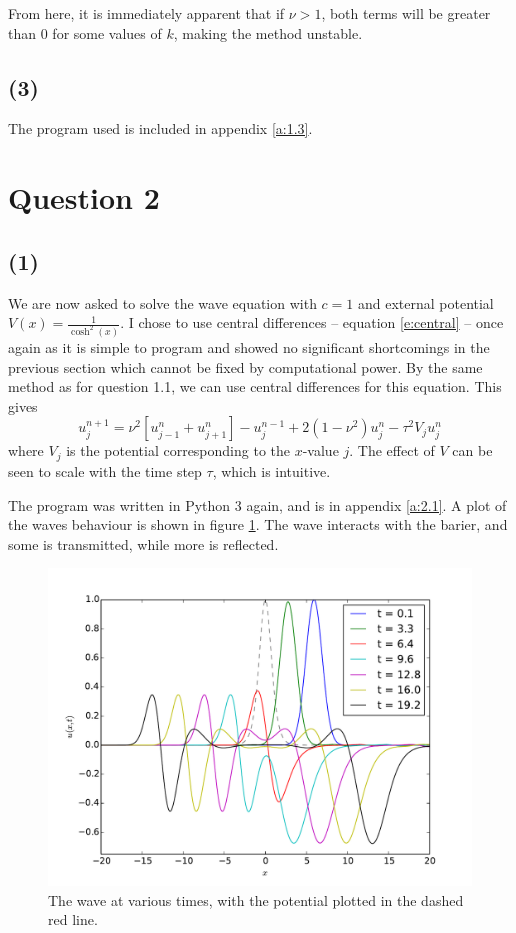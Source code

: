 \documentclass[10pt]{article}
\newcommand{\ujn}{u_{j}^{n}}
\newcommand{\ujpn}{u_{j+1}^{n}}
\newcommand{\ujmn}{u_{j-1}^{n}}
\newcommand{\ujnp}{u_{j}^{n+1}}
\newcommand{\ujnm}{u_{j}^{n-1}}
\begin{document}
From here, it is immediately apparent that if $\nu >1$, both terms will be greater
than $0$ for some values of $k$, making the method unstable.

\subsection*{(3)}
The program used is included in appendix \ref{a:1.3}.


\section*{Question 2}
\subsection*{(1)}
We are now asked to solve the wave equation with $c=1$ and external potential
$V(x) = \frac{1}{\cosh^2(x)}$.
I chose to use central differences -- equation \ref{e:central} -- once again as it
is simple to program and showed no significant shortcomings in the previous
section which cannot be fixed by computational power.
By the same method as for question 1.1, we can use central differences for this
equation. This gives
\begin{equation}
\ujnp = \nu^2 \left[\ujmn + \ujpn \right] - \ujnm + 2(1 - \nu^2)\ujn - \tau^2 V_j \ujn
\label{e:cdp}
\end{equation}
where $V_j$ is the potential corresponding to the $x$-value $j$. The effect of
$V$ can be seen to scale with the time step $\tau$, which is intuitive.

The program was written in Python 3 again, and is in appendix \ref{a:2.1}.
A plot of the waves behaviour is shown in figure \ref{f:cosh}.
The wave interacts with the barier, and some is transmitted, while more
is reflected.

\begin{figure}
  \centering
  \includegraphics[width=\textwidth]{2/cosh.pdf}
  \caption{The wave at various times, with the potential plotted in the dashed red line.}
  \label{f:cosh}
\end{figure}
\end{document}
